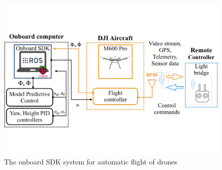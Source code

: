 \documentclass[journal]{./template/IEEEtran}
\begin{document}
\begin{figure}[h]
\centering\includegraphics[scale=0.285]{fig7/SDK.pdf}
\caption{The onboard SDK system for automatic flight of drones}
\label{fig:SDK}
\end{figure}
\end{document}
